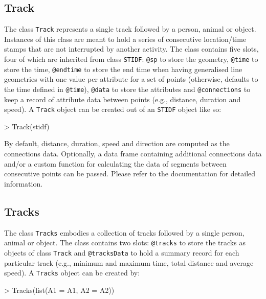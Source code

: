 \documentclass{article}
\newcommand{\code}[1]{{\tt #1}}
\begin{document}
\subsection{Track}

The class \code{Track} represents a single track followed by a person, animal or object. Instances of this class are meant to hold a series of consecutive location/time stamps that are not interrupted by another activity. The class contains five slots, four of which are inherited from class \code{STIDF}: \code{@sp} to store the geometry, \code{@time} to store the time, \code{@endtime} to store the end time when having generalised line geometries with one value per attribute for a set of points (otherwise, defaults to the time defined in \code{@time}), \code{@data} to store the attributes and \code{@connections} to keep a record of attribute data between points (e.g., distance, duration and speed). A \code{Track} object can be created out of an \code{STIDF} object like so:

\begin{Schunk}
\begin{Sinput}
> Track(stidf)
\end{Sinput}
\end{Schunk}

By default, distance, duration, speed and direction are computed as the connections data. Optionally, a data frame containing additional connections data and/or a custom function for calculating the data of segments between consecutive points can be passed. Please refer to the documentation for detailed information.

\subsection{Tracks}

The class \code{Tracks} embodies a collection of tracks followed by a single person, animal or object. The class contains two slots: \code{@tracks} to store the tracks as objects of class \code{Track} and \code{@tracksData} to hold a summary record for each particular track (e.g., minimum and maximum time, total distance and average speed). A \code{Tracks} object can be created by:

\begin{Schunk}
\begin{Sinput}
> Tracks(list(A1 = A1, A2 = A2))
\end{Sinput}
\end{Schunk}
\end{document}
